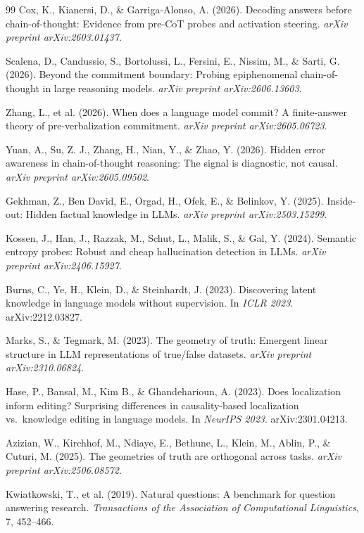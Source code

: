 \documentclass[11pt]{article}
\begin{document}
\begin{thebibliography}{99}
Cox, K., Kianersi, D., \& Garriga-Alonso, A. (2026).
Decoding answers before chain-of-thought: Evidence from pre-{CoT} probes and activation
steering.
\emph{arXiv preprint arXiv:2603.01437}.

Scalena, D., Candussio, S., Bortolussi, L., Fersini, E., Nissim, M., \& Sarti, G. (2026).
Beyond the commitment boundary: Probing epiphenomenal chain-of-thought in large
reasoning models.
\emph{arXiv preprint arXiv:2606.13603}.

Zhang, L., et al. (2026).
When does a language model commit? A finite-answer theory of pre-verbalization
commitment.
\emph{arXiv preprint arXiv:2605.06723}.

Yuan, A., Su, Z. J., Zhang, H., Nian, Y., \& Zhao, Y. (2026).
Hidden error awareness in chain-of-thought reasoning: The signal is diagnostic,
not causal.
\emph{arXiv preprint arXiv:2605.09502}.

Gekhman, Z., Ben David, E., Orgad, H., Ofek, E., \& Belinkov, Y. (2025).
Inside-out: Hidden factual knowledge in {LLMs}.
\emph{arXiv preprint arXiv:2503.15299}.

Kossen, J., Han, J., Razzak, M., Schut, L., Malik, S., \& Gal, Y. (2024).
Semantic entropy probes: Robust and cheap hallucination detection in {LLMs}.
\emph{arXiv preprint arXiv:2406.15927}.

Burns, C., Ye, H., Klein, D., \& Steinhardt, J. (2023).
Discovering latent knowledge in language models without supervision.
In \emph{ICLR 2023}. arXiv:2212.03827.

Marks, S., \& Tegmark, M. (2023).
The geometry of truth: Emergent linear structure in {LLM} representations of
true/false datasets.
\emph{arXiv preprint arXiv:2310.06824}.

Hase, P., Bansal, M., Kim B., \& Ghandeharioun, A. (2023).
Does localization inform editing? Surprising differences in causality-based localization
vs.\ knowledge editing in language models.
In \emph{NeurIPS 2023}. arXiv:2301.04213.

Azizian, W., Kirchhof, M., Ndiaye, E., Bethune, L., Klein, M., Ablin, P., \&
Cuturi, M. (2025).
The geometries of truth are orthogonal across tasks.
\emph{arXiv preprint arXiv:2506.08572}.

Kwiatkowski, T., et al. (2019).
Natural questions: A benchmark for question answering research.
\emph{Transactions of the Association of Computational Linguistics}, 7, 452--466.

\end{thebibliography}
\end{document}
